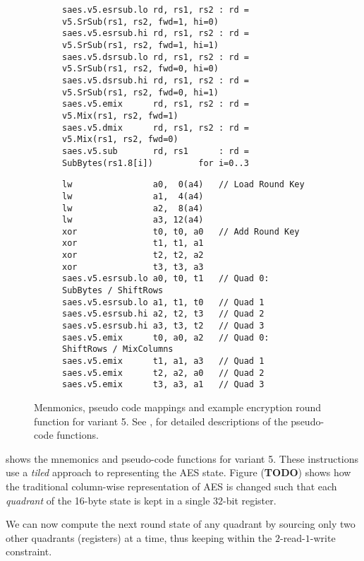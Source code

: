 \begin{figure}
\begin{subfigure}{\textwidth}
\begin{lstlisting}[language=pseudo,style=block]
saes.v5.esrsub.lo rd, rs1, rs2 : rd = v5.SrSub(rs1, rs2, fwd=1, hi=0)
saes.v5.esrsub.hi rd, rs1, rs2 : rd = v5.SrSub(rs1, rs2, fwd=1, hi=1)
saes.v5.dsrsub.lo rd, rs1, rs2 : rd = v5.SrSub(rs1, rs2, fwd=0, hi=0)
saes.v5.dsrsub.hi rd, rs1, rs2 : rd = v5.SrSub(rs1, rs2, fwd=0, hi=1)
saes.v5.emix      rd, rs1, rs2 : rd = v5.Mix(rs1, rs2, fwd=1)
saes.v5.dmix      rd, rs1, rs2 : rd = v5.Mix(rs1, rs2, fwd=0)
saes.v5.sub       rd, rs1      : rd = SubBytes(rs1.8[i])         for i=0..3
\end{lstlisting}
\caption{}
\label{fig:mnemonics:v5}
\end{subfigure}
\begin{subfigure}{\textwidth}
\begin{lstlisting}[language=pseudo,style=block]
lw                a0,  0(a4)   // Load Round Key
lw                a1,  4(a4)
lw                a2,  8(a4)
lw                a3, 12(a4)
xor               t0, t0, a0   // Add Round Key
xor               t1, t1, a1
xor               t2, t2, a2
xor               t3, t3, a3
saes.v5.esrsub.lo a0, t0, t1   // Quad 0: SubBytes / ShiftRows
saes.v5.esrsub.lo a1, t1, t0   // Quad 1
saes.v5.esrsub.hi a2, t2, t3   // Quad 2
saes.v5.esrsub.hi a3, t3, t2   // Quad 3
saes.v5.emix      t0, a0, a2   // Quad 0: ShiftRows / MixColumns
saes.v5.emix      t1, a1, a3   // Quad 1
saes.v5.emix      t2, a2, a0   // Quad 2
saes.v5.emix      t3, a3, a1   // Quad 3
\end{lstlisting}
\caption{}
\label{fig:round:v5}
\end{subfigure}
\caption{
    Menmonics, pseudo code mappings and example encryption
    round function for variant 5.
    See ,  for detailed
    descriptions of the pseudo-code functions.
}
\end{figure}

 shows the mnemonics and pseudo-code functions
for variant 5.
These instructions use a {\em tiled} approach to representing the
AES state.
Figure ({\bf TODO}) shows how the traditional column-wise representation
of AES is changed such that each {\em quadrant} of the 16-byte state
is kept in a single $32$-bit register.

We can now compute the next round state of any quadrant by sourcing
only two other quadrants (registers) at a time, thus keeping within
the $2$-read-$1$-write constraint.

